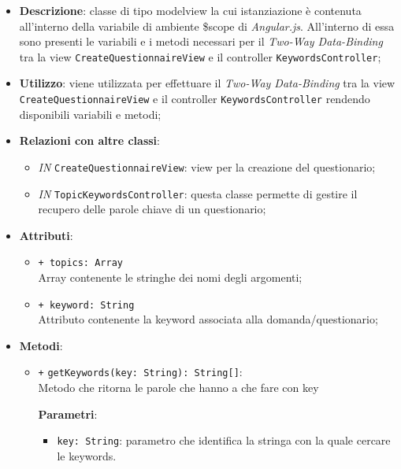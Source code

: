 				\begin{itemize}
					\item \textbf{Descrizione}: classe di tipo modelview la cui istanziazione è contenuta all'interno della variabile di ambiente \$scope di \textit{Angular.js}. All'interno di essa sono presenti le variabili e i metodi necessari per il \textit{Two-Way Data-Binding} tra la view \texttt{CreateQuestionnaireView} e il controller \texttt{KeywordsController};
					\item \textbf{Utilizzo}: viene utilizzata per effettuare il \textit{Two-Way Data-Binding} tra la view \texttt{CreateQuestionnaireView} e il controller \texttt{KeywordsController} rendendo disponibili variabili e metodi;
					\item \textbf{Relazioni con altre classi}: 
					\begin{itemize}
						\item \textit{IN} \texttt{CreateQuestionnaireView}: view per la creazione del questionario; 
						\item \textit{IN} \texttt{TopicKeywordsController}: questa classe permette di gestire il recupero delle parole chiave di un questionario;
					\end{itemize}
					\item \textbf{Attributi}: 
					\begin{itemize}
						\item \texttt{+ topics: Array} \\ Array contenente le stringhe dei nomi degli argomenti;
						\item \texttt{+ keyword: String} \\ Attributo contenente la keyword associata alla domanda/questionario;
					\end{itemize}
					\item \textbf{Metodi}: 
					\begin{itemize}
						\item \texttt{+} \texttt{getKeywords(key: String): String[]}: \\ Metodo che ritorna le parole che hanno a che fare con key
						
						\textbf{Parametri}:
						\begin{itemize}
							\item \texttt{key: String}: parametro che identifica la stringa con la quale cercare le keywords. 
						\end{itemize}
					\end{itemize}
				\end{itemize}
				
					